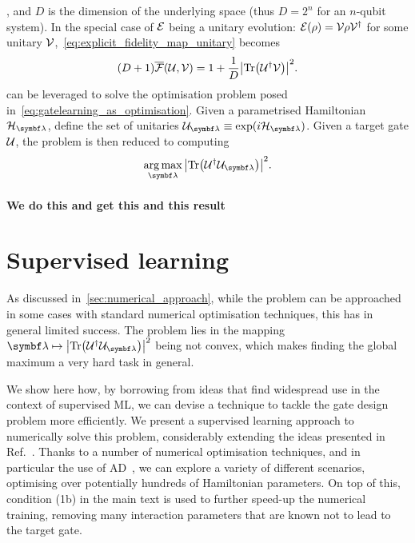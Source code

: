 , and
$D$ is the dimension of the underlying space (thus $D=2^n$ for an $n$-qubit system).
In the special case of ${\mathcal{E}}$ being a unitary evolution: ${\mathcal{E}}(\rho)={\mathcal{V}}\rho {\mathcal{V}}^\dagger$ for some unitary ${\mathcal{V}}$,~\cref{eq:explicit_fidelity_map_unitary} becomes
\begin{equation}
    (D+1) \overline{{\mathcal{F}}}({\mathcal{U}}, {\mathcal{V}}) =
    1 + \frac{1}{D} \abs{\Tr({\mathcal{U}}^\dagger {\mathcal{V}})}^2.
    \label{eq:explicit_fidelity_unitary_unitary}
\end{equation}
 can be leveraged to solve the optimisation problem posed in~\cref{eq:gatelearning_as_optimisation}.
Given a parametrised Hamiltonian $\calH_{\bslambda}$, define the set of unitaries $\calU_{\bslambda}\equiv\exponential(i\calH_{\bslambda})$. Given a target gate ${\mathcal{U}}$, the problem is then reduced to computing
\begin{equation}
    \argmax_{\bslambda} \abs{\Tr(\calU^\dagger \calU_{\bslambda})}^2.
\end{equation}

\paragraph{We do this and get this and this result}




\section{Supervised learning}
\label{sec:supervised_learning}

As discussed in~\cref{sec:numerical_approach}, while the problem can be approached in some cases with standard numerical optimisation techniques, this has in general limited success.
The problem lies in the mapping $\bslambda\mapsto\abs{\Tr(\calU^\dagger \calU_{\bslambda})}^2$ being not convex, which makes finding the global maximum a very hard task in general.

We show here how, by borrowing from ideas that find widespread use in the context of supervised \ac{ML}, we can devise a technique to tackle the gate design problem more efficiently.
We present a supervised learning approach to numerically solve this problem, considerably extending the ideas presented in Ref.~\cite{banchi2016quantum}.
Thanks to a number of numerical optimisation techniques, and in particular the use of \ac{AD}~\cite{baydin2015automatic,bartholomewbiggs2000automatic,wengert1964a,bischof2008advances}, we can explore a variety of different scenarios, optimising over potentially hundreds of Hamiltonian parameters.
On top of this, condition (1b) in the main text is used to further speed-up the numerical training, removing many interaction parameters that are known not to lead to the target gate.

